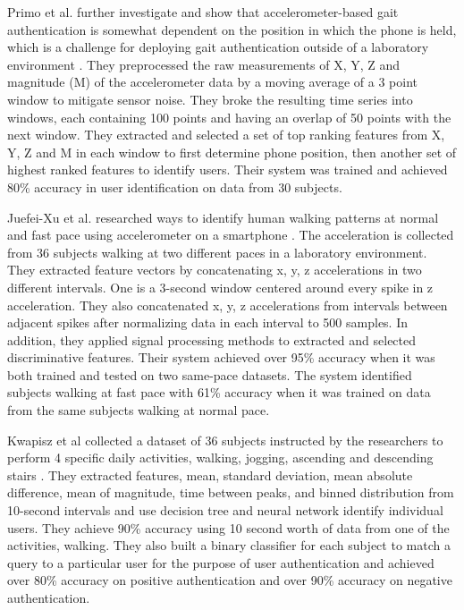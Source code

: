 \documentclass{soups}
\begin{document}
Primo et al. further investigate and show that accelerometer-based gait authentication is somewhat dependent on the position in which the phone is held, which is a challenge for deploying gait authentication outside of a laboratory environment \cite{primo:context}. 
They preprocessed the raw measurements of X, Y, Z and magnitude (M) of the accelerometer data by a moving average of a 3 point window to mitigate sensor noise. 
They broke the resulting time series into windows, each containing 100 points and having an overlap of 50 points with the next window. 
They extracted and selected a set of top ranking features from X, Y, Z and M in each window to first determine phone position, then another set of highest ranked features to identify users. 
Their system was trained and achieved 80\% accuracy in user identification on data from 30 subjects.

Juefei-Xu et al. researched ways to identify human walking patterns at normal and fast pace using accelerometer on a smartphone \cite{xu:pace}. 
The acceleration is collected from 36 subjects walking at two different paces in a laboratory environment. 
They extracted feature vectors by concatenating x, y, z accelerations in two different intervals. 
One is a 3-second window centered around every spike in z acceleration. 
They also concatenated x, y, z accelerations from intervals between adjacent spikes after normalizing data in each interval to 500 samples. 
In addition, they applied signal processing methods to extracted and selected discriminative features. 
Their system achieved over 95\% accuracy when it was both trained and tested on two same-pace datasets. 
The system identified subjects walking at fast pace with 61\% accuracy when it was trained on data from the same subjects walking at normal pace.

Kwapisz et al collected a dataset of 36 subjects instructed by the researchers to perform 4 specific daily activities, walking, jogging, ascending and descending stairs \cite{kwapisz:biometrics}. 
They extracted features, mean, standard deviation, mean absolute difference, mean of magnitude, time between peaks, and binned distribution from 10-second intervals and use decision tree and neural network identify individual users. 
They achieve 90\% accuracy using 10 second worth of data from one of the activities, walking. 
They also built a binary classifier for each subject to match a query to a particular user for the purpose of user authentication and achieved over 80\% accuracy on positive authentication and over 90\% accuracy on negative authentication.
\end{document}
